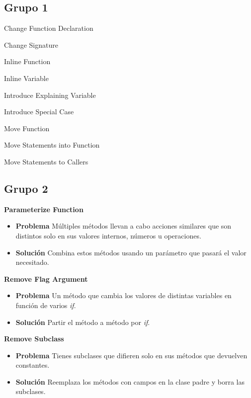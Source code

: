 \documentclass[11pt,a4paper,oneside]{book}
\begin{document}
\subsection{Grupo 1}
Change Function Declaration

Change Signature 

Inline Function

Inline Variable

Introduce Explaining Variable

Introduce Special Case

Move Function

Move Statements into Function

Move Statements to Callers


\subsection{Grupo 2}
\textbf{Parameterize Function}
\label{ParameterizeFunction}
\begin{itemize}
    \item \textbf{Problema} Múltiples métodos llevan a cabo acciones similares que son distintos solo en sus valores internos, números u operaciones.
    
    
    \item \textbf{Solución} Combina estos métodos usando un parámetro que pasará el valor necesitado.
      
\end{itemize}

\textbf{Remove Flag Argument}
\label{RemoveFlagArgument}
\begin{itemize}
    \item \textbf{Problema} Un método que cambia los valores de distintas variables en función de varios \textit{if}.
    
    \item \textbf{Solución} Partir el método a método por \textit{if}.
    
\end{itemize}


\textbf{Remove Subclass}
\label{RemobeSubclass}
\begin{itemize}
    \item \textbf{Problema} Tienes subclases que difieren solo en sus métodos que devuelven constantes.
    
    \item \textbf{Solución} Reemplaza los métodos con campos en la clase padre y borra las subclases.
    
\end{itemize}
\end{document}
